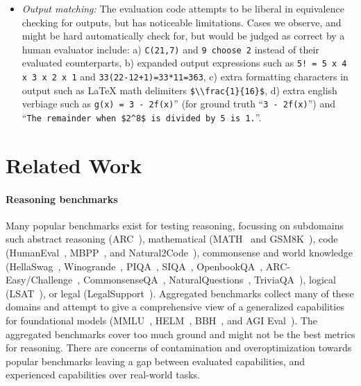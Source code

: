 \documentclass[11pt,a4paper]{article}
\begin{document}
\begin{itemize}
  \item {\em Output matching:} The evaluation code attempts to be liberal in equivalence
    checking for outputs, but has noticeable limitations. Cases we observe, and
    might be hard automatically check for, but would be judged as correct by a
    human evaluator include: a) \verb|C(21,7)| and \verb|9 choose 2| instead of
    their evaluated counterparts, b) expanded output expressions such as
    \verb|5! = 5 x 4 x 3 x 2 x 1| and \verb|33(22-12+1)=33*11=363|, c)
    extra formatting characters in output such as LaTeX math delimiters
    \verb|$\\frac{1}{16}$|,
    d) extra english verbiage such as
    \verb|g(x) = 3 - 2f(x)|'' (for ground truth ``\verb|3 - 2f(x)|'') and\\
    ``\verb|The remainder when $2^8$ is divided by 5 is 1.|''.

\end{itemize}

\section{Related Work}

\paragraph{Reasoning benchmarks}
Many popular benchmarks exist for testing reasoning, focussing on subdomains
such
abstract reasoning (ARC~\cite{cholet-arc}),
mathematical (MATH~\cite{math} and GSM8K~\cite{gsm8k}),
code (HumanEval~\cite{humaneval}, MBPP~\cite{mbpp}, and Natural2Code~\cite{gemini}),
commonsense and world knowledge
(HellaSwag~\cite{hellaswag},
Winogrande~\cite{winogrande}, PIQA~\cite{piqa}, SIQA~\cite{siqa},
OpenbookQA~\cite{openbookqa}, ARC-Easy/Challenge~\cite{arc-easy-challenge},
CommonsenseQA~\cite{commonsenseQA},
NaturalQuestions~\cite{naturalquestions}, TriviaQA~\cite{triviaQA}),
logical (LSAT~\cite{lsat}),
or legal (LegalSupport~\cite{helm}).
Aggregated benchmarks collect many of these domains and attempt to give
a comprehensive view of a generalized capabilities for foundational models
(MMLU~\cite{mmlu},
HELM~\cite{helm}, BBH~\cite{big-bench-hard}, and AGI Eval~\cite{agi-eval}).
The aggregated benchmarks cover too much ground and might not be the best
metrics for reasoning.
There are concerns of contamination and overoptimization towards popular
benchmarks leaving a gap between evaluated capabilities, and experienced
capabilities over real-world tasks.
\end{document}
